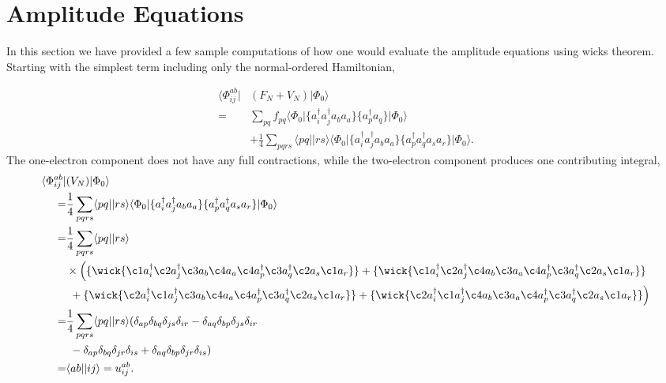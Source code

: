 \documentclass[
    a4paper, aps, twocolumn, floatfix, superscriptaddress,
    nofootinbib]{revtex4-1}
\newcommand{\1}{\mathds{1}}
\newcommand{\bra}[1]{\langle #1\lvert}
\newcommand{\ket}[1]{\rvert #1\rangle}
\begin{document}
\section{Amplitude Equations}

	\label{app:wickOnAmplitude}

	In this section we have provided a few sample computations of how one would
	evaluate the amplitude equations using wicks theorem. Starting with the simplest
	term including only the normal-ordered Hamiltonian, 

	\begin{equation}
		\begin{aligned}
			\bra{\Phi_{ij}^{ab}} &(F_N + V_N)\ket{\Phi_0} \\
			 =& \sum_{pq}f_{pq}\bra{\Phi_0}\{a_i^\dagger a_j^\dagger a_ba_a\}\{a^\dagger_pa_q\}\ket{\Phi_0} \\
			 &+\frac{1}{4}\sum_{pqrs}\bra{pq}\ket{rs}
			 \bra{\Phi_0}\{a_i^\dagger a_j^\dagger a_ba_a\}\{a^\dagger_pa^\dagger_qa_sa_r\}\ket{\Phi_0}.
		\end{aligned}
		\end{equation}
		The one-electron component does not have any full contractions, while the
		two-electron component produces one contributing integral,
		\begin{equation}
		\begin{aligned}
			\bra{\Phi_{ij}^{ab}} &(V_N)\ket{\Phi_0} \\
				=& \frac{1}{4}\sum_{pqrs}\bra{pq}\ket{rs}
			 \bra{\Phi_0}\{a_i^\dagger a_j^\dagger a_ba_a\}\{a^\dagger_pa^\dagger_qa_sa_r\}\ket{\Phi_0} \\
			 	=& \frac{1}{4} \sum_{pqrs} \bra{pq}\ket{rs} \\ &\times\Big(
			 		\{ \wick{\c1 a^\dagger_i \c2 a^\dagger_j \c3 a_b \c4 a_a
			 		\c4 a^\dagger_p \c3 a^\dagger_q \c2 a_s \c1 a_r}\}
			 		+
			 		\{ \wick{\c1 a^\dagger_i \c2 a^\dagger_j \c4 a_b \c3 a_a
			 		\c4 a^\dagger_p \c3 a^\dagger_q \c2 a_s \c1 a_r}\} \\
			 	  &\ +
			 	 	\{ \wick{\c2 a^\dagger_i \c1 a^\dagger_j \c3 a_b \c4 a_a
			 		\c4 a^\dagger_p \c3 a^\dagger_q \c2 a_s \c1 a_r}\}
			 		+
			 		\{ \wick{\c2 a^\dagger_i \c1 a^\dagger_j \c4 a_b \c3 a_a
			 		\c4 a^\dagger_p \c3 a^\dagger_q \c2 a_s \c1 a_r}\}
			 	\Big) \\
			 	=&  \frac{1}{4} \sum_{pqrs} \bra{pq}\ket{rs} 
			 	( \delta_{ap}\delta_{bq}\delta_{js}\delta_{ir}
			 	 -\delta_{aq}\delta_{bp}\delta_{js}\delta_{ir} \\
			     &\ -\delta_{ap}\delta_{bq}\delta_{jr}\delta_{is}
			 	 +\delta_{aq}\delta_{bp}\delta_{jr}\delta_{is}) \\
			 	 =& \bra{ab}\ket{ij} = u^{ab}_{ij}.
		\end{aligned}
		\end{equation}
		
\end{document}
